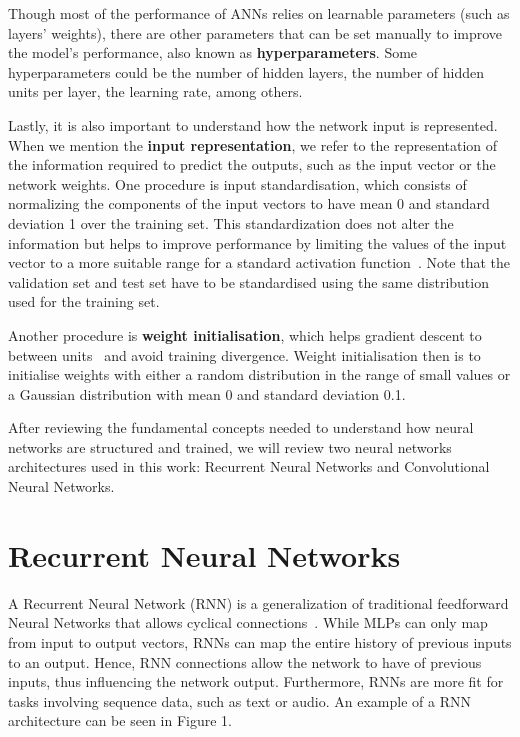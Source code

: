 Though most of the performance of ANNs relies on learnable parameters (such as layers’ weights), 
there are other parameters that can be set manually to improve the model’s performance, also 
known as \textbf{hyperparameters}. Some hyperparameters could be the number of hidden layers, 
the number of hidden units per layer, the learning rate, among others.

Lastly, it is also important to understand how the network input is represented. When we 
mention the \textbf{input representation}, we refer to the representation of the information 
required to predict the outputs, such as the input vector or the network weights. One 
procedure is input standardisation, which consists of normalizing the components of the input 
vectors to have mean 0 and standard deviation 1 over the training set. This standardization 
does not alter the information but helps to improve performance by limiting the values of the 
input vector to a more suitable range for a standard activation function~\cite{appendix:lecun1998efficient}. 
Note that the validation set and test set have to be standardised using the same distribution 
used for the training set. 

Another procedure is \textbf{weight initialisation}, which helps gradient descent to 
 between units~\cite{appendix:lecun1998efficient} and avoid training 
divergence. Weight initialisation then is to initialise weights with either a random 
distribution in the range of small values or a Gaussian distribution with mean 0 and 
standard deviation 0.1.

After reviewing the fundamental concepts needed to understand how neural networks are 
structured and trained, we will review two neural networks architectures used in this work: 
Recurrent Neural Networks and Convolutional Neural Networks.

\section{Recurrent Neural Networks}
\label{appendix:neuralNetworks/rnn}
A Recurrent Neural Network (RNN) is a generalization of traditional feedforward Neural 
Networks that allows cyclical connections~\cite{seqlab:Graves2012-385}. While MLPs can only 
map from input to output vectors, RNNs can map the entire history of previous inputs to an 
output. Hence, RNN connections allow the network to have  of previous inputs, thus 
influencing the network output. Furthermore, RNNs are more fit for tasks involving sequence 
data, such as text or audio. An example of a RNN architecture can be seen in Figure 1.

